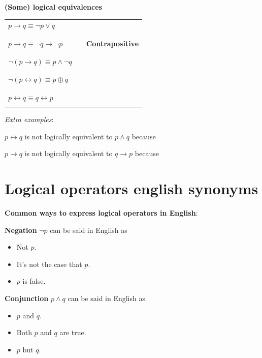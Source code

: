 \documentclass[12pt, oneside]{article}
\begin{document}
{\bf (Some) logical equivalences}

\begin{tabular}{llp{3in}}
$p \to q \equiv \lnot p \lor q$ & & \\
&& \\
&& \\
$p \to q \equiv \lnot q \to \lnot p$ & &{\bf Contrapositive} \\
&& \\
&& \\
$\lnot (p \to q) \equiv p\land \lnot q$  & &\\
&& \\
&& \\
$\lnot( p \leftrightarrow q) \equiv p \oplus q$ && \\
&& \\
&& \\
$p \leftrightarrow q \equiv q \leftrightarrow p$ &&\\
&& \\
\end{tabular}

\vfill

{\it Extra examples}:

$p \leftrightarrow q$ is not logically equivalent to $p \land q$ because \underline{\phantom{\hspace{4in}}} 

$p \to q$ is not logically equivalent to $q \to p$ because \underline{\phantom{\hspace{4in}}} 
\vfill
 \vfill
\section*{Logical operators english synonyms}


{\bf Common ways to express logical operators in English}:

{\bf Negation} $\lnot p$ can be said in English as 

\vspace{-20pt}
\begin{itemize}
\item Not $p$.
\item It's not the case that $p$.
\item $p$ is false.
\end{itemize}

{\bf Conjunction} $p \land q$ can be said in English as

\vspace{-20pt}
\begin{itemize}
    \item $p$ and $q$.
    \item Both $p$ and $q$ are true.
    \item $p$ but $q$.
\end{itemize}
\end{document}
